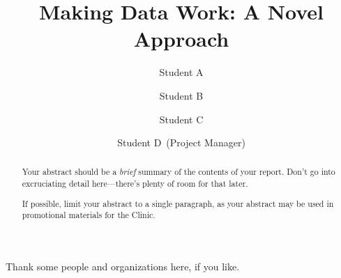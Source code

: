 \documentclass{cmccapstone}
\title{Making Data Work: A Novel Approach}
\author{Student A \and Student B \and Student C \and Student D~(Project Manager)}
\begin{document}

\frontmatter




\maketitle



\begin{abstract}
  Your abstract should be a \emph{brief} summary of the contents of
  your report.  Don't go into excruciating detail here---there's
  plenty of room for that later.

  If possible, limit your abstract to a single paragraph, as your
  abstract may be used in promotional materials for the Clinic.
\end{abstract}



\tableofcontents
\listoffigures
\listoftables



\begin{acknowledgments}
Thank some people and organizations here, if you like.
\end{acknowledgments}
\end{document}
